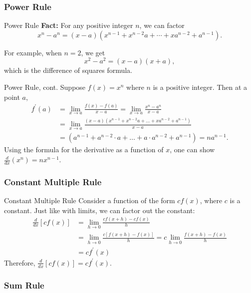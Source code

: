 \documentclass[cal1spr16Lectures.tex]{subfiles}
\begin{document}
\subsubsection{Power Rule}

\begin{frame}{\small Power Rule}{}
{\bf Fact:} For any positive integer $n$, we can factor
\[x^n-a^n=(x-a)(x^{n-1}+x^{n-2}a+\cdots+xa^{n-2}+a^{n-1}).\]

For example, when $n=2$, we get
\[x^2-a^2=(x-a)(x+a),\]
which is the difference of squares formula.
\end{frame}

\begin{frame}{\small Power Rule, cont.}\footnotesize
Suppose $f(x)=x^n$ where $n$ is a positive integer.  Then at a point $a$,
\begin{align*}
f^{\prime}(a) &= \lim_{x \to a} \frac{f(x)-f(a)}{x-a} = \lim_{x \to a} \frac{x^n - a^n}{x-a} \\[0.25pc]
&= \lim_{x \to a} \frac{(x-a)(x^{n-1}+x^{n-2}a + \dots + xa^{n-2}+a^{n-1})}{x-a} \\[0.25pc]
&= (a^{n-1}+a^{n-2}\cdot a + \dots + a \cdot a^{n-2} + a^{n-1}) = n a^{n-1}. 
\end{align*}
Using the formula for the derivative as a function of $x$, one can show \alert{$\frac{d}{dx} (x^n)= nx^{n-1}$}.
\end{frame}

\subsubsection{Constant Multiple Rule}

\begin{frame}{\small Constant Multiple Rule}
Consider a function of the form $cf(x)$, where $c$ is a constant.  Just like with limits, we can factor out the constant: 
\begin{align*}
\frac{d}{dx}[cf(x)] &= \lim_{h \to 0} \frac{cf(x+h)-cf(x)}{h} \\
&= \lim_{h \to 0} \frac{c[f(x+h)-f(x)]}{h} = c\lim_{h \to 0} \frac{f(x+h)-f(x)}{h} \\[0.25pc]
&= cf^{\prime}(x)
\end{align*}
Therefore, \alert{$\frac{d}{dx}[cf(x)]=cf^{\prime}(x)$}.
\end{frame}

\subsubsection{Sum Rule}
\end{document}
